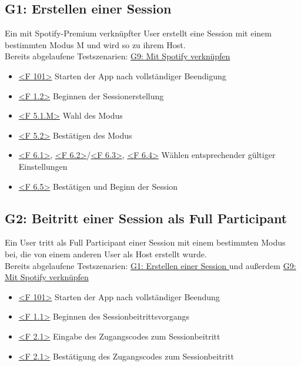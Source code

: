 \documentclass[oneside, ngerman]{sdqtechreport}
\begin{document}
\subsection{G1: Erstellen einer Session}
\label{subsec:Tests:GrundlegendeTestszenarien:G1}
\hypertarget{G1}{}
\newcommand{\gOne}{\hyperlink{G1}{G1: Erstellen einer Session }}
Ein mit Spotify-Premium verknüpfter User erstellt eine Session mit einem bestimmten Modus M und wird so zu ihrem Host. \\
\newcommand{\gNine}{\hyperlink{G9}{G9: Mit Spotify verknüpfen}}
Bereits abgelaufene Testszenarien: \gNine
\begin{itemize}
    \item \hyperlink{<F 101>}{<F 101>} Starten der App nach vollständiger Beendigung
    \item \hyperlink{<F 1.2>}{<F 1.2>} Beginnen der Sessionerstellung
    \item \hyperlink{<F 5.1.M>}{<F 5.1.M>} Wahl des Modus
    \item \hyperlink{<F 5.2>}{<F 5.2>} Bestätigen des Modus
    \item \hyperlink{<F 6.1>}{<F 6.1>}, \hyperlink{<F 6.2>}{<F 6.2>}/\hyperlink{<F 6.3>}{<F 6.3>}, \hyperlink{<F 6.4>}{<F 6.4>} Wählen entsprechender gültiger Einstellungen
    \item \hyperlink{<F 6.5>}{<F 6.5>} Bestätigen und Beginn der Session
\end{itemize}


\subsection{G2: Beitritt einer Session als Full Participant}
\label{subsec:Tests:GrundlegendeTestszenarien:G2}
\hypertarget{G2}{}
\newcommand{\gTwo}{\hyperlink{G2}{G2: Beitritt einer Session als Full Participant }}
Ein User tritt als Full Participant einer Session mit einem bestimmten Modus bei, die von einem anderen User als Host erstellt wurde. \\
Bereits abgelaufene Testszenarien: \gOne und außerdem \gNine
\begin{itemize}
    \item \hyperlink{<F 101>}{<F 101>} Starten der App nach vollständiger Beendung
    \item \hyperlink{<F 1.1>}{<F 1.1>} Beginnen des Sessionbeitrittsvorgangs
    \item \hyperlink{<F 2.1>}{<F 2.1>} Eingabe des Zugangscodes zum Sessionbeitritt
    \item \hyperlink{<F 2.1>}{<F 2.1>} Bestätigung des Zugangscodes zum Sessionbeitritt
\end{itemize}
\end{document}
